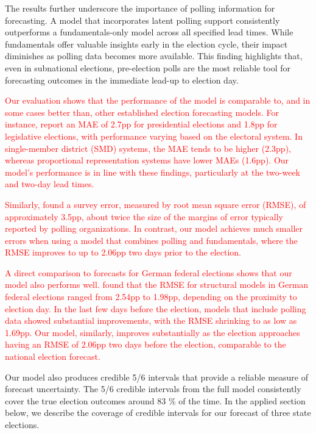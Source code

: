 \documentclass[12pt]{article}
\begin{document}
\begin{doublespacing}
The results further underscore the importance of polling information for forecasting. A model that incorporates latent polling support consistently outperforms a fundamentals-only model across all specified lead times. While fundamentals offer valuable insights early in the election cycle, their impact diminishes as polling data becomes more available. This finding highlights that, even in subnational elections, pre-election polls are the most reliable tool for forecasting outcomes in the immediate lead-up to election day.

\textcolor{red}{Our evaluation shows that the performance of the model is comparable to, and in some cases better than, other established election forecasting models. For instance, \citet{jennings2018election} report an MAE of 2.7pp for presidential elections and 1.8pp for legislative elections, with performance varying based on the electoral system. In single-member district (SMD) systems, the MAE tends to be higher (2.3pp), whereas proportional representation systems have lower MAEs (1.6pp). Our model's performance is in line with these findings, particularly at the two-week and two-day lead times.}

\textcolor{red}{Similarly, \citet{shirani2018disentangling} found a survey error, measured by root mean square error (RMSE), of approximately 3.5pp, about twice the size of the margins of error typically reported by polling organizations. In contrast, our model achieves much smaller errors when using a model that combines polling and fundamentals, where the RMSE improves to up to 2.06pp two days prior to the election.}

\textcolor{red}{A direct comparison to forecasts for German federal elections shows that our model also performs well. \citet{munzert_2017} found that the RMSE for structural models in German federal elections ranged from 2.54pp to 1.98pp, depending on the proximity to election day. In the last few days before the election, models that include polling data showed substantial improvements, with the RMSE shrinking to as low as 1.69pp. Our model, similarly, improves substantially as the election approaches having an RMSE of 2.06pp two days before the election, comparable to the national election forecast.}

Our model also produces credible 5/6 intervals that provide a reliable measure of forecast uncertainty. The 5/6 credible intervals from the full model consistently cover the true election outcomes around 83 \% of the time. In the applied section below, we describe the coverage of credible intervals for our forecast of three state elections.


\end{doublespacing}
\end{document}
